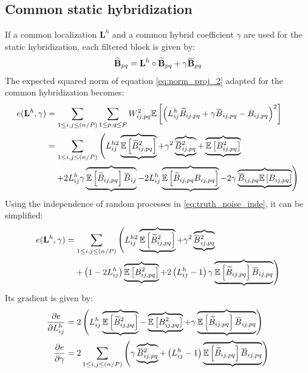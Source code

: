 \documentclass[12pt]{scrartcl}
\newcommand{\overbar}[1]{\mkern 1.5mu\overline{\mkern-1.5mu#1\mkern-1.5mu}\mkern 1.5mu}
\begin{document}
\subsection{Common static hybridization}
If a common localization $\mathbf{L}^h$ and a common hybrid coefficient $\gamma$ are used for the static hybridization, each filtered block is given by:
\begin{align}
\widehat{\mathbf{B}}_{pq} = \mathbf{L}^h \circ \widetilde{\mathbf{B}}_{pq} + \gamma \overbar{\mathbf{B}}_{pq}
\end{align}
The expected squared norm of equation \eqref{eq:norm_proj_2} adapted for the common hybridization becomes:
\begin{align}
e(\mathbf{L}^h,\gamma) & = \sum_{1 \le i,j \le (n/P)} \sum_{1 \le p,q \le P} W_{ij,pq}^2 \mathbb{E}\left[ \left(L^h_{ij} \widetilde{B}_{ij,pq} + \gamma \overbar{B}_{ij,pq} - B_{ij,pq} \right)^2 \right] \nonumber \\
& = \sum_{1 \le i,j \le (n/P)} \left(L^{h2}_{ij} \underbrace{\overbrace{\mathbb{E} \left[\widetilde{B}_{ij,pq}^2\right]}} + \gamma^2 \underbrace{\overbrace{\overbar{B}_{ij,pq}^2}} + \underbrace{\overbrace{\mathbb{E} \left[B^2_{ij,pq}\right]}} \right. \nonumber \\
& \left. \quad + 2 L^h_{ij} \gamma \underbrace{\overbrace{\mathbb{E} \left[\widetilde{B}_{ij,pq}\right]  \overbar{B}_{ij}}} - 2 L^h_{ij} \underbrace{\overbrace{\mathbb{E} \left[\widetilde{B}_{ij,pq} B_{ij,pq}\right]}} - 2 \gamma \underbrace{\overbrace{\overbar{B}_{ij,pq} \mathbb{E} \left[B_{ij,pq}\right]}} \right)
\end{align}
Using the independence of random processes in \eqref{eq:truth_noise_inde}, it can be simplified:
\begin{align}
e(\mathbf{L}^h,\gamma) & = \sum_{1 \le i,j \le (n/P)} \left(L^{h2}_{ij} \underbrace{\overbrace{\mathbb{E} \left[\widetilde{B}_{ij,pq}^2\right]}} + \gamma^2 \underbrace{\overbrace{\overbar{B}_{ij,pq}^2}} \right. \nonumber \\
& \left. \quad + \left(1 - 2 L^h_{ij}\right) \underbrace{\overbrace{\mathbb{E} \left[B^2_{ij,pq}\right]}} + 2 \left(L^h_{ij} - 1\right) \gamma  \underbrace{\overbrace{\mathbb{E} \left[\widetilde{B}_{ij,pq}\right] \overbar{B}_{ij,pq}}} \right)
\end{align}
Its gradient is given by:
\begin{subequations}
\begin{align}
\frac{\partial e}{\partial L^h_{ij}} & = 2 \left(L^h_{ij} \underbrace{\overbrace{\mathbb{E} \left[\widetilde{B}_{ij,pq}^2\right]}} - \underbrace{\overbrace{\mathbb{E} \left[B^2_{ij,pq}\right]}} + \gamma \underbrace{\overbrace{\mathbb{E} \left[\widetilde{B}_{ij,pq}\right]  \overbar{B}_{ij,pq}}} \right) \\
\frac{\partial e}{\partial \gamma} & = 2 \sum_{1 \le i,j \le (n/P)} \left(\gamma \underbrace{\overbrace{\overbar{B}_{ij,pq}^2}} + \left(L^h_{ij} - 1\right) \underbrace{\overbrace{\mathbb{E} \left[\widetilde{B}_{ij,pq}\right] \overbar{B}_{ij,pq}}} \right)
\end{align}
\end{subequations}
\end{document}
